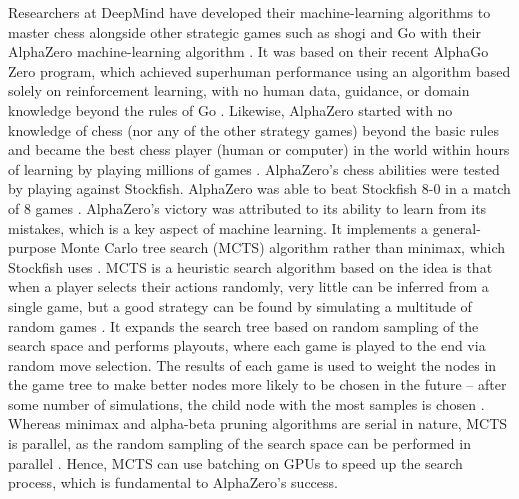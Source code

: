 \documentclass[%
 superscriptaddress,
showpacs,preprintnumbers,
 amsmath,
 amssymb,
 aps,
 pra,
showkeys,
onecolumn,
notitlepage,
11pt,
tightenlines      %
]{revtex4-1}
\begin{document}
Researchers at DeepMind have developed their machine-learning algorithms to master chess alongside other strategic games such as shogi and Go with their AlphaZero machine-learning algorithm \cite{silver2018general}. It was based on their recent AlphaGo Zero program, which achieved superhuman performance using an algorithm based solely on reinforcement learning, with no human data, guidance, or domain knowledge beyond the rules of Go \cite{silver2017mastering}. Likewise, AlphaZero started with no knowledge of chess (nor any of the other strategy games) beyond the basic rules and became the best chess player (human or computer) in the world within hours of learning by playing millions of games \cite{strogatz2018one}. AlphaZero's chess abilities were tested by playing against Stockfish. AlphaZero was able to beat Stockfish 8-0 in a match of 8 games \cite{silver2018general}. AlphaZero's victory was attributed to its ability to learn from its mistakes, which is a key aspect of machine learning. It implements a general-purpose Monte Carlo tree search (MCTS) algorithm rather than minimax, which Stockfish uses \cite{silver2017mastering2}. MCTS is a heuristic search algorithm based on the idea is that when a player selects their actions randomly, very little can be inferred from a single game, but a good strategy can be found by simulating a multitude of random games \cite{chaslot2008monte}. It expands the search tree based on random sampling of the search space and performs playouts, where each game is played to the end via random move selection. The results of each game is used to weight the nodes in the game tree to make better nodes more likely to be chosen in the future -- after some number of simulations, the child node with the most samples is chosen \cite{chaslot2008monte}. Whereas minimax and alpha-beta pruning algorithms are serial in nature, MCTS is parallel, as the random sampling of the search space can be performed in parallel \cite{silver2017mastering2}. Hence, MCTS can use batching on GPUs to speed up the search process, which is fundamental to AlphaZero's success.
\end{document}
